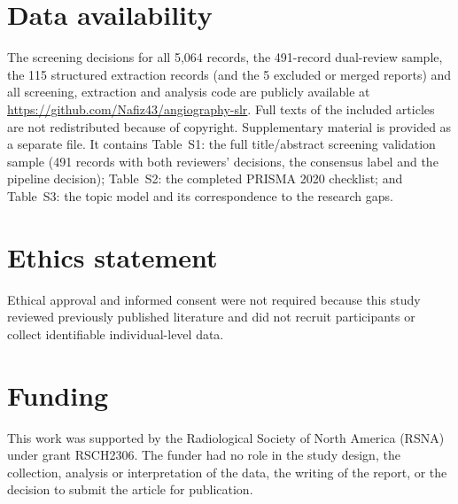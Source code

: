\documentclass[a4paper,fleqn]{cas-dc}
\newcommand{\edit}[1]{{\color{editcolor}#1}}
\begin{document}





\FloatBarrier %
\printcredits




\edit{\nocite{R0058,R0099,R0100,R0521,R0554,R0570,R0643,R1213,R1222,R1263,R1362,R1503,R1541,R1565,R1609,R1674,R1680,R1939,R2400,R2411,R2443,R2466,R2490,R2786,R2873,R3052,R3093,R3126,R3129,R3149,R3155,R3164,R3338,R3661,R3707,R3712,R3910,R4114,R4204,R4208,R4220,R4557,R4804,ref10,ref100,ref102,ref104,ref127,ref144,ref148,ref15,ref152,ref155,ref161,ref162,ref172,ref173,ref178,ref179,ref190,ref198,ref2,ref20,ref202,ref208,ref211,ref227,ref25,ref28,ref30,ref32,ref34,ref35,ref36,ref38,ref39,ref4,ref40,ref42,ref43,ref46,ref48,ref50,ref51,ref52,ref56,ref57,ref60,ref62,ref63,ref64,ref65,ref66,ref67,ref69,ref71,ref72,ref74,ref75,ref76,ref78,ref79,ref80,ref82,ref84,ref89,ref91,ref92,ref93,ref94,ref95,ref96,ref97,ref99,shi2021temporal}}

\section*{Data availability}
The screening decisions for all 5,064 records, the 491-record dual-review sample, the \edit{115} structured extraction records \edit{(and the 5 excluded or merged reports)} and all screening, extraction and analysis code are publicly available at \edit{\url{https://github.com/Nafiz43/angiography-slr}}. Full texts of the included articles are not redistributed because of copyright. Supplementary material is provided as a separate file. It contains Table~S1: the full title/abstract screening validation sample (491 records with both reviewers' decisions, the consensus label and the pipeline decision); Table~S2: the completed PRISMA 2020 checklist; and Table~S3: the topic model and its correspondence to the research gaps.

\newcommand{\EthicsText}{Ethical approval and informed consent were not required because this study reviewed previously published literature and did not recruit participants or collect identifiable individual-level data.}
\section*{Ethics statement}
\EthicsText

\section*{Funding}
This work was supported by the Radiological Society of North America (RSNA) under grant RSCH2306. The funder had no role in the study design, the collection, analysis or interpretation of the data, the writing of the report, or the decision to submit the article for publication.
\end{document}
